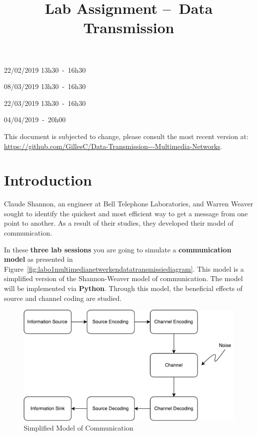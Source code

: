 \documentclass[12pt,a4paper]{article}
\title{Lab Assignment --\ Data Transmission\\\vspace{0.5cm}{\Large Multimedia Networks}}
\author{\authorName}
\newcommand{\dateSessionOne}{22/02/2019 13h30\ -\ 16h30}
\newcommand{\dateSessionTwo}{08/03/2019 13h30\ -\ 16h30}
\newcommand{\dateSessionThree}{22/03/2019 13h30\ -\ 16h30}
\newcommand{\softDeadline}{04/04/2019\ -\ 20h00}
\begin{document}
\maketitle
\vfill


\begin{center}

  \begin{minipage}{0.65\linewidth}
\begin{description}[style=multiline, leftmargin=4cm]
	\item[Lab session 1] \dateSessionOne
	\item[Lab session 2] \dateSessionTwo
	\item[Lab session 3] \dateSessionThree
\end{description}
\vfill
\begin{description}[style=multiline, leftmargin=4cm]
	\item[Deadline] \softDeadline
\end{description}
\vfill
{\footnotesize
This document is subjected to change, please consult the most recent version at: \url{https://github.com/GillesC/Data-Transmission---Multimedia-Networks}.
}
\end{minipage}
\end{center}

\vfill
\clearpage


\section{Introduction}
Claude Shannon, an engineer at Bell Telephone Laboratories, and Warren Weaver sought to identify the quickest and most efficient way to get a message from one point to another. As a result of their studies, they developed their model of communication.

In these \textbf{three lab sessions} you are going to simulate a \textbf{communication model} as presented in Figure~\vref{fig:labo1multimedianetwerkendatatransmissiediagram}. This model is a simplified version of the Shannon-Weaver model of communication. The model will be implemented via \textbf{Python}. Through this model, the beneficial effects of source and channel coding are studied. 

\begin{figure}[h]
	\centering
	\includegraphics[width=0.7\linewidth]{labo_1_multimedianetwerken_datatransmissie_diagram.pdf}
	\caption{Simplified Model of Communication}\label{fig:labo1multimedianetwerkendatatransmissiediagram}
\end{figure}
\end{document}
